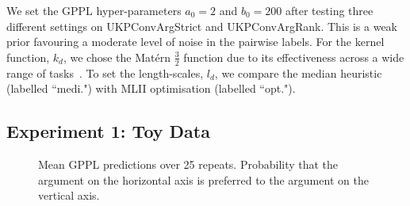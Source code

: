 We set the GPPL hyper-parameters $a_0=2$ and $b_0=200$ after
testing three different settings on UKPConvArgStrict and UKPConvArgRank.
This is a weak prior favouring a moderate level of noise in the pairwise labels.
For the kernel function, $k_d$, we chose the Mat\'ern $\frac{3}{2}$ function due to its 
effectiveness across a wide range of tasks~\cite{rasmussen_gaussian_2006}.
To set the length-scales, $l_d$, we compare the median heuristic (labelled ``medi.")
with MLII optimisation (labelled ``opt.").

\subsection{Experiment 1: Toy Data}

\begin{figure}
\centering
{}
\caption{Mean GPPL predictions over 25 repeats. Probability that the argument 
on the horizontal axis is preferred to the argument on the vertical axis.}
\label{fig:gppl_classification}
\end{figure}
